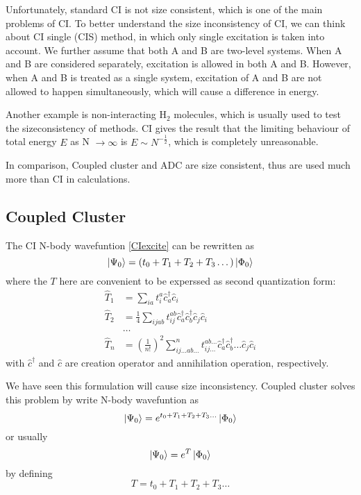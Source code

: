 Unfortunately, standard CI is not size consistent, which is one of the main problems of CI.
To better understand the size inconsistency of CI, we can think about CI single (CIS) method, in which only single excitation is taken into account.
We further assume that both A and B are two-level systems.
When A and B are considered separately, excitation is allowed in both A and B.
However, when A and B is treated as a single system, excitation of A and B are not allowed to happen simultaneously, which will cause a difference in energy.

Another example is non-interacting $\text{H}_2$ molecules, which is usually used to test the sizeconsistency of methods. \cite{h2problem}
CI gives the result that the limiting behaviour of total energy $E$ as N $\rightarrow \infty$ is $E \sim N^{-\frac{1}{2}}$, which is completely unreasonable.

In comparison, Coupled cluster and ADC are size consistent, thus are used much more than CI in calculations.

\subsection{Coupled Cluster}
The CI N-body wavefuntion \ref{CIexcite} can be rewritten as 
\begin{equation}
\ket{\Psi_0}=(t_0+T_1+T_2+T_3 \dots)\ket{\Phi_0}
\end{equation}
where the $T$ here are convenient to be experssed as second quantization form:
\begin{equation}
\begin{aligned}
	\hat{T}_{1} &=\sum_{i a} t_{i}^{a} \hat{c}_{a}^{\dagger} \hat{c}_{i}
	\\
	\hat{T}_{2} &=\frac{1}{4} \sum_{i j a b} t_{i j}^{a b} \hat{c}_{a}^{\dagger} \hat{c}_{b}^{\dagger} \hat{c}_{j} \hat{c}_{i}
	\\
	&\dots
	\\
	\hat{T}_{n}&=\left(\frac{1}{n !}\right)^{2} \sum_{i j \ldots a b \ldots}^{n} t_{i j \ldots}^{a b \ldots} \hat{c}_{a}^{\dagger} \hat{c}_{b}^{\dagger} \ldots \hat{c}_{j} \hat{c}_{i}
\end{aligned}
\end{equation}
with $\hat{c}^{\dagger}$ and $\hat{c}$ are creation operator and annihilation operation, respectively.

We have seen this formulation will cause size inconsistency.
Coupled cluster solves this problem by write N-body wavefuntion as
\begin{equation}
\ket{\Psi_0}=e^{t_0+T_1+T_2+T_3 \dots}\ket{\Phi_0}
\end{equation}
or usually
\begin{equation}
\ket{\Psi_0}=e^{T}\ket{\Phi_0}
\end{equation}
by defining
\begin{equation}
T=t_0+T_1+T_2+T_3 \dots
\end{equation}

